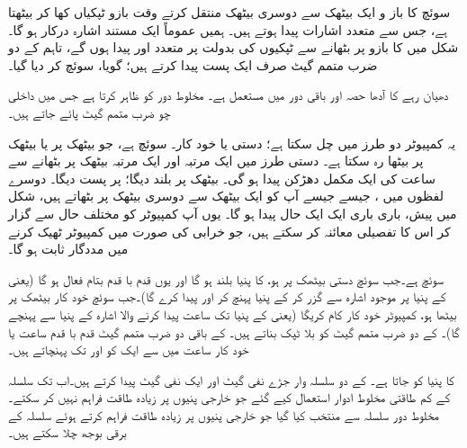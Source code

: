 سوئچ کا باز و ایک بیٹھک سے دوسری  بیٹھک منتقل کرتے وقت  بازو  ٹپکیاں کھا کر بیٹھتا ہے، جس سے متعدد اشارات پیدا ہوتے  ہیں۔ ہمیں عموماً ایک مستند  اشارہ درکار ہو گا۔ شکل  میں   کا بازو   پر  بٹھانے سے ٹپکیوں کی بدولت   پر متعدد  اور      پیدا ہوں گے، تاہم  کے دو ضرب متمم گیٹ صرف ایک  پست  پیدا کرتے ہیں؛ گویا،  سوئچ  کر دیا  گیا۔

دھیان رہے  کا آدھا حصہ   اور باقی    دور میں  مستعمل ہے۔    مخلوط  دور    کو ظاہر کرتا ہے جس میں    داخلی  چو ضرب  متمم  گیٹ  پائے جاتے ہیں۔

یہ کمپیوٹر دو  طرز  میں چل سکتا ہے؛ دستی   یا خود کار۔ سوئچ ہے، جو  بیٹھک پر یا   بیٹھک پر بیٹھا  رہ سکتا ہے۔  دستی طرز میں   ایک مرتبہ    اور ایک  مرتبہ    بیٹھک  پر  بٹھانے  سے  ساعت کی  ایک مکمل   دھڑکن پیدا ہو گی۔  بیٹھک پر  بلند  دیگا؛   پر  پست  دیگا۔ دوسرے لفظوں میں ، جیسے جیسے آپ  کو ایک بیٹھک سے دوسری بیٹھک پر     بٹھاتے ہیں، شکل   میں پیش،   باری باری ایک ایک  حال پیدا ہو گا۔ یوں آپ  کمپیوٹر  کو  مختلف  حال سے گزار کر اس کا تفصیلی معائنہ  کر سکتے ہیں، جو  خرابی کی صورت میں کمپیوٹر ٹھیک کرنے میں مددگار ثابت ہو گا۔

 سوئچ  ہے۔جب سوئچ  دستی بیٹھک پر  ہو،  کا پنیا  بلند ہو گا اور یوں  قدم با قدم بتام فعال ہو گا  (یعنی  کے پنیا   پر موجود اشارہ  سے گزر کر  کے پنیا  پہنچ کر   اور  پیدا کرے گا)۔جب سوئچ  خود کار بیٹھک پر  بیٹھا ہو، کمپیوٹر خود کار  کام کریگا   (یعنی  کے پنیا  تک   ساعت پیدا کرنے والا   اشارہ   کے پنیا سے پہنچے گا)۔  کے دو ضرب متمم گیٹ  کو بلا ٹپک بناتے ہیں۔ کے باقی دو  ضرب متمم گیٹ  قدم  با قدم ساعت یا خود کار ساعت  میں سے ایک کو  اور  تک پہنچاتے ہیں۔

 کا پنیا   کو  جاتا ہے۔ کے  دو سلسلہ وار جڑے نفی گیٹ  اور  ایک نفی گیٹ  پیدا کرتے ہیں۔اب  تک   سلسلہ کے کم طاقتی  مخلوط ادوار استعمال کیے گئے  جو  خارجی پنیوں پر زیادہ طاقت فراہم نہیں کر سکتے۔   مخلوط دور  سلسلہ سے منتخب کیا گیا  جو  خارجی پنیوں پر زیادہ طاقت  فراہم  کرتے ہوئے  سلسلہ کے  برقی بوجھ چلا سکتے  ہیں۔

